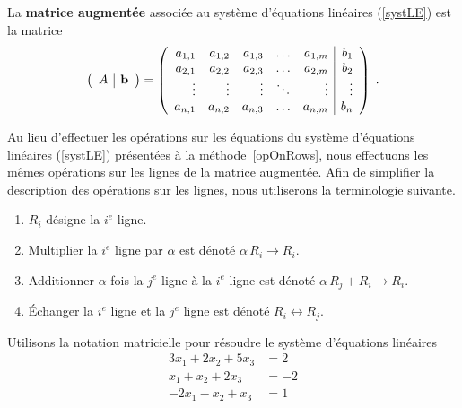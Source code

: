 {\begin{focus}{\dfn} 
La {\bfseries matrice augmentée} associée au
système d'équations linéaires (\ref{systLE}) est la matrice
\[
\left(\begin{array}{c|c}{A}&{\mathbf{b}}\end{array}\right) = \left(\begin{array}{rrrrr|r}
a_{1,1} & a_{1,2} & a_{1,3} & \ldots & a_{1,m} & b_1 \\
a_{2,1} & a_{2,2} & a_{2,3} & \ldots & a_{2,m} & b_2 \\
\vdots & \vdots & \vdots & \ddots & \vdots & \vdots \\
a_{n,1} & a_{n,2} & a_{n,3} & \ldots & a_{n,m} & b_n
\end{array}\right) \; .
\]
\end{focus}

Au lieu d'effectuer les opérations sur les équations du système
d'équations linéaires (\ref{systLE}) présentées à la
méthode~\ref{opOnRows}, nous effectuons les mêmes opérations
sur les lignes de la matrice augmentée.  Afin de simplifier la
description des opérations sur les lignes, nous utiliserons la
terminologie suivante.

\begin{focus}{\dfn}
\begin{enumerate}
\item $R_i$ désigne la $i^e$ ligne.
\item Multiplier la $i^e$ ligne par $\alpha$ est dénoté \quad
$\alpha\,R_i \to R_i$.
\item Additionner $\alpha$ fois la $j^e$ ligne à la $i^e$ ligne est dénoté
\quad $\alpha\,R_j + R_i \to R_i$. 
\item Échanger la $i^e$ ligne et la $j^e$ ligne est dénoté \quad
$R_i \leftrightarrow R_j$.
\end{enumerate}
\end{focus}

\begin{egg}
Utilisons la notation matricielle pour résoudre le système d'équations
linéaires
\begin{equation} \label{exSEL1}
\begin{split}
3x_1 + 2x_2 + 5x_3 &= 2\\
x_1 + x_2 + 2x_3 &= -2\\
-2x_1 - x_2 + x_3 &= 1
\end{split}
\end{equation}


\end{egg}}
